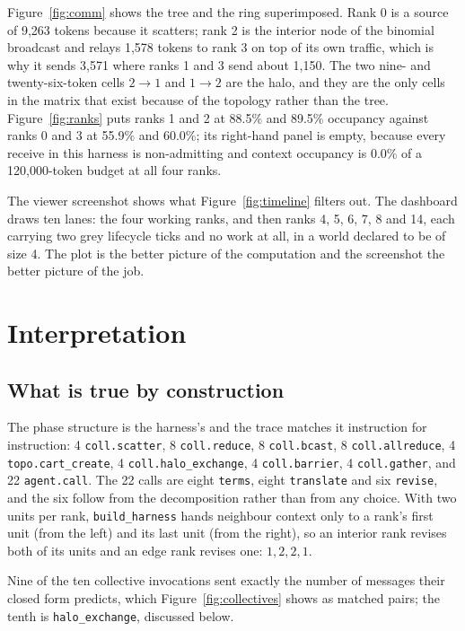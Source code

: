 \documentclass[11pt]{article}
\begin{document}
Figure~\ref{fig:comm} shows the tree and the ring superimposed. Rank 0 is a source of 9{,}263
tokens because it scatters; rank 2 is the interior node of the binomial broadcast and relays
1{,}578 tokens to rank 3 on top of its own traffic, which is why it sends 3{,}571 where ranks 1
and 3 send about 1{,}150. The two nine- and twenty-six-token cells $2\!\to\!1$ and $1\!\to\!2$ are
the halo, and they are the only cells in the matrix that exist because of the topology rather than
the tree. Figure~\ref{fig:ranks} puts ranks 1 and 2 at 88.5\% and 89.5\% occupancy against ranks 0
and 3 at 55.9\% and 60.0\%; its right-hand panel is empty, because every receive in this harness
is non-admitting and context occupancy is 0.0\% of a 120{,}000-token budget at all four ranks.

The viewer screenshot shows what Figure~\ref{fig:timeline} filters out. The dashboard draws ten
lanes: the four working ranks, and then ranks 4, 5, 6, 7, 8 and 14, each carrying two grey
lifecycle ticks and no work at all, in a world declared to be of size 4. The plot is the better
picture of the computation and the screenshot the better picture of the job.

\section{Interpretation}

\subsection*{What is true by construction}

The phase structure is the harness's and the trace matches it instruction for instruction: 4
\texttt{coll.scatter}, 8 \texttt{coll.reduce}, 8 \texttt{coll.bcast}, 8 \texttt{coll.allreduce},
4 \texttt{topo.cart\_create}, 4 \texttt{coll.halo\_exchange}, 4 \texttt{coll.barrier}, 4
\texttt{coll.gather}, and 22 \texttt{agent.call}. The 22 calls are eight \texttt{terms}, eight
\texttt{translate} and six \texttt{revise}, and the six follow from the decomposition rather than
from any choice. With two units per rank, \texttt{build\_harness} hands neighbour context only to
a rank's first unit (from the left) and its last unit (from the right), so an interior rank
revises both of its units and an edge rank revises one: $1,2,2,1$.

Nine of the ten collective invocations sent exactly the number of messages their closed form
predicts, which Figure~\ref{fig:collectives} shows as matched pairs; the tenth is
\texttt{halo\_exchange}, discussed below.
\end{document}
